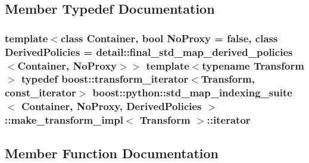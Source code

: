 \subsection{Member Typedef Documentation}
\hypertarget{structboost_1_1python_1_1std__map__indexing__suite_1_1make__transform__impl_a64d7b60f0e792533c1cc89b84f341b0d}{}
\subsubsection[{iterator}]{\setlength{\rightskip}{0pt plus 5cm}template$<$class Container, bool No\+Proxy = false, class Derived\+Policies = detail\+::final\+\_\+std\+\_\+map\+\_\+derived\+\_\+policies$<$\+Container, No\+Proxy$>$$>$ template$<$typename Transform $>$ typedef boost\+::transform\+\_\+iterator$<$Transform, {\bf const\+\_\+iterator}$>$ {\bf boost\+::python\+::std\+\_\+map\+\_\+indexing\+\_\+suite}$<$ Container, No\+Proxy, Derived\+Policies $>$\+::{\bf make\+\_\+transform\+\_\+impl}$<$ Transform $>$\+::{\bf iterator}}\label{structboost_1_1python_1_1std__map__indexing__suite_1_1make__transform__impl_a64d7b60f0e792533c1cc89b84f341b0d}


\subsection{Member Function Documentation}
\hypertarget{structboost_1_1python_1_1std__map__indexing__suite_1_1make__transform__impl_ab74967f0d94cdc5adcae986110974656}{}
